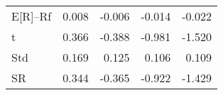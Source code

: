 \begin{tabular}{lrrrr}
\toprule
\midrule
E[R]--Rf & 0.008 & -0.006 & -0.014 & -0.022 \\
t & 0.366 & -0.388 & -0.981 & -1.520 \\
Std & 0.169 & 0.125 & 0.106 & 0.109 \\
SR & 0.344 & -0.365 & -0.922 & -1.429 \\
\bottomrule
\end{tabular}
